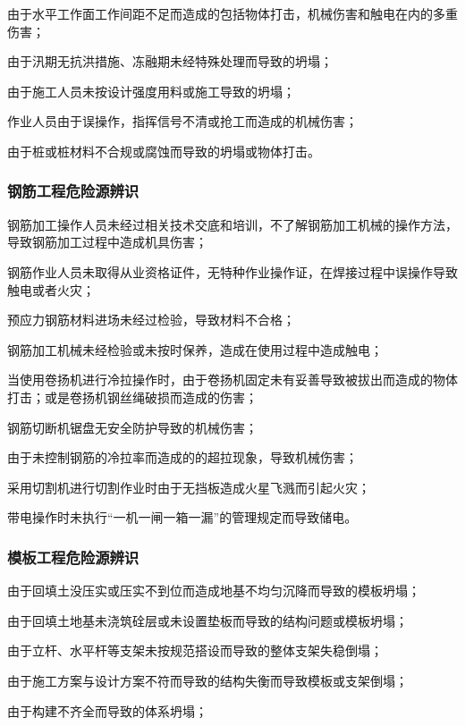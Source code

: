  由于水平工作面工作间距不足而造成的包括物体打击，机械伤害和触电在内的多重伤害；

 由于汛期无抗洪措施、冻融期未经特殊处理而导致的坍塌；

 由于施工人员未按设计强度用料或施工导致的坍塌；

 作业人员由于误操作，指挥信号不清或抢工而造成的机械伤害；

 由于桩或桩材料不合规或腐蚀而导致的坍塌或物体打击。

\subsubsection{钢筋工程危险源辨识}

 钢筋加工操作人员未经过相关技术交底和培训，不了解钢筋加工机械的操作方法，导致钢筋加工过程中造成机具伤害；

 钢筋作业人员未取得从业资格证件，无特种作业操作证，在焊接过程中误操作导致触电或者火灾；

 预应力钢筋材料进场未经过检验，导致材料不合格；

 钢筋加工机械未经检验或未按时保养，造成在使用过程中造成触电；

 当使用卷扬机进行冷拉操作时，由于卷扬机固定未有妥善导致被拔出而造成的物体打击；或是卷扬机钢丝绳破损而造成的伤害；

 钢筋切断机锯盘无安全防护导致的机械伤害；

 由于未控制钢筋的冷拉率而造成的的超拉现象，导致机械伤害；

 采用切割机进行切割作业时由于无挡板造成火星飞溅而引起火灾；

 带电操作时未执行“一机一闸一箱一漏”的管理规定而导致储电。

\subsubsection{模板工程危险源辨识}

 由于回填土没压实或压实不到位而造成地基不均匀沉降而导致的模板坍塌；

 由于回填土地基未浇筑硂层或未设置垫板而导致的结构问题或模板坍塌；

 由于立杆、水平杆等支架未按规范搭设而导致的整体支架失稳倒塌；

 由于施工方案与设计方案不符而导致的结构失衡而导致模板或支架倒塌；

 由于构建不齐全而导致的体系坍塌；

